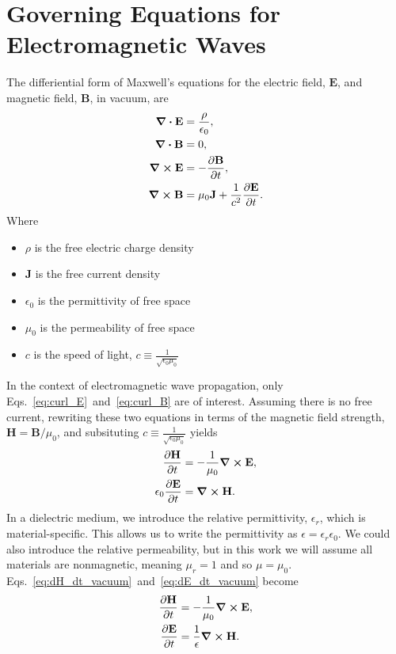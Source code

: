 \documentclass[12pt,twocolumn]{article}
\begin{document}
\section{Governing Equations for Electromagnetic Waves}
The differiential form of Maxwell's equations for the electric field, $\mathbf{E}$, and magnetic field, $\mathbf{B}$, in vacuum, are~\cite{Jackson99}
\begin{subequations}
\begin{align}
\div{\mathbf{E}} &= \frac{\rho}{\epsilon_0}, \\
\div{\mathbf{B}} &= 0, \\
\label{eq:curl_E}\curl{\mathbf{E}}&= -\frac{\partial\mathbf{B}}{\partial t}, \\
\label{eq:curl_B}\curl{\mathbf{B}}&= \mu_0\mathbf{J}+\frac{1}{c^2}\frac{\partial\mathbf{E}}{\partial t}.
\end{align}
\end{subequations}
Where
\begin{itemize}
\item $\rho$ is the free electric charge density
\item $\mathbf{J}$ is the free current density
\item $\epsilon_0$ is the permittivity of free space
\item $\mu_0$ is the permeability of free space
\item $c$ is the speed of light, $c\equiv\frac{1}{\sqrt{\epsilon_0\mu_0}}$
\end{itemize}
In the context of electromagnetic wave propagation, only Eqs.~\ref{eq:curl_E}~and~\ref{eq:curl_B} are of interest. Assuming there is no free current, rewriting these two equations in terms of the magnetic field strength, $\mathbf{H}=\mathbf{B}/\mu_0$, and subsituting $c\equiv\frac{1}{\sqrt{\epsilon_0\mu_0}}$ yields
\begin{subequations}
\begin{align}
\label{eq:dH_dt_vacuum}\frac{\partial\mathbf{H}}{\partial t} &= -\frac{1}{\mu_0}\curl{\mathbf{E}}, \\
\label{eq:dE_dt_vacuum}\epsilon_0\frac{\partial\mathbf{E}}{\partial t} &= \curl{\mathbf{H}}.
\end{align}
\end{subequations}
In a dielectric medium, we introduce the relative permittivity, $\epsilon_r$, which is material-specific. This allows us to write the permittivity as $\epsilon=\epsilon_r\epsilon_0$. We could also introduce the relative permeability, but in this work we will assume all materials are nonmagnetic, meaning $\mu_r=1$ and so $\mu=\mu_0$. Eqs.~\ref{eq:dH_dt_vacuum}~and~\ref{eq:dE_dt_vacuum} become
\begin{subequations}
\begin{align}
\frac{\partial\mathbf{H}}{\partial t} &= -\frac{1}{\mu_0}\curl{\mathbf{E}}, \\
\frac{\partial\mathbf{E}}{\partial t} &= \frac{1}{\epsilon}\curl{\mathbf{H}}.
\end{align}
\end{subequations}
\end{document}
